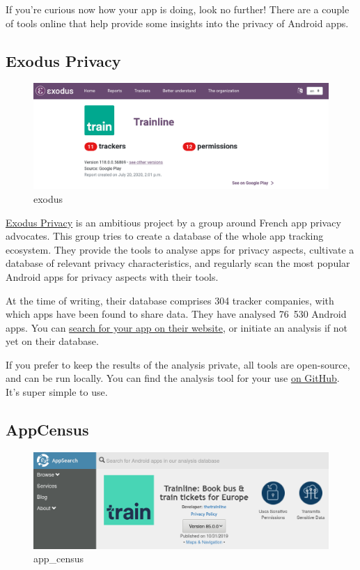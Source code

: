 \documentclass[
]{book}
\begin{document}
If you're curious now how your app is doing, look no further! There are a couple of tools online that help provide some insights into the privacy of Android apps.

\hypertarget{exodus-privacy}{%
\subsection{Exodus Privacy}\label{exodus-privacy}}

\begin{figure}
\centering
\includegraphics{images/exodus.png}
\caption{exodus}
\end{figure}

\href{https://reports.exodus-privacy.eu.org/en/}{Exodus Privacy} is an ambitious project by a group around French app privacy advocates. This group tries to create a database of the whole app tracking ecosystem. They provide the tools to analyse apps for privacy aspects, cultivate a database of relevant privacy characteristics, and regularly scan the most popular Android apps for privacy aspects with their tools.

At the time of writing, their database comprises 304 tracker companies, with which apps have been found to share data. They have analysed 76~530 Android apps. You can \href{https://reports.exodus-privacy.eu.org/en/reports/}{search for your app on their website}, or initiate an analysis if not yet on their database.

If you prefer to keep the results of the analysis private, all tools are open-source, and can be run locally. You can find the analysis tool for your use \href{https://github.com/Exodus-Privacy/exodus-standalone}{on GitHub}. It's super simple to use.

\hypertarget{appcensus}{%
\subsection{AppCensus}\label{appcensus}}

\begin{figure}
\centering
\includegraphics{images/app_census.png}
\caption{app\_census}
\end{figure}
\end{document}

